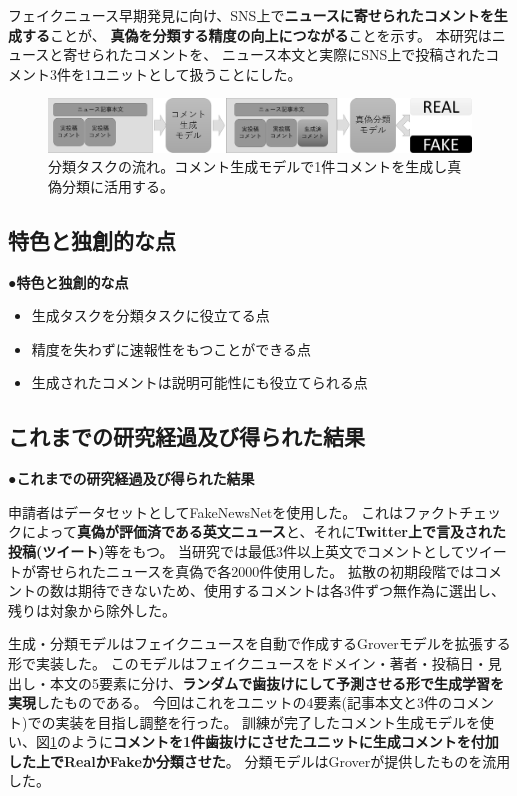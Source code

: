{	フェイクニュース早期発見に向け、SNS上で\textbf{ニュースに寄せられたコメントを生成する}ことが、
	\textbf{真偽を分類する精度の向上につながる}ことを示す。
	本研究はニュースと寄せられたコメントを、
	ニュース本文と実際にSNS上で投稿されたコメント3件を1ユニットとして扱うことにした。
	
	\begin{figure}[ht]
		\centering
		\includegraphics[width=0.95\linewidth]{model.pdf}
		\caption{分類タスクの流れ。コメント生成モデルで1件コメントを生成し真偽分類に活用する。}
		\label{fig:model}
	\end{figure}

	\subsection{特色と独創的な点}
	●\textbf{特色と独創的な点}
	
	\begin{itemize}
		\item 生成タスクを分類タスクに役立てる点
		\item 精度を失わずに速報性をもつことができる点
		\item 生成されたコメントは説明可能性にも役立てられる点
	\end{itemize}

	\subsection{これまでの研究経過及び得られた結果}
	●\textbf{これまでの研究経過及び得られた結果}

	申請者はデータセットとしてFakeNewsNet\cite{Shu2018FakeNewsNetAD}を使用した。
	これはファクトチェックによって\textbf{真偽が評価済である英文ニュース}と、それに\textbf{Twitter上で言及された投稿(ツイート)}等をもつ。
	当研究では最低3件以上英文でコメントとしてツイートが寄せられたニュースを真偽で各2000件使用した。
	拡散の初期段階ではコメントの数は期待できないため、使用するコメントは各3件ずつ無作為に選出し、残りは対象から除外した。

	生成・分類モデルはフェイクニュースを自動で作成するGroverモデル\cite{NIPS2019_9106}を拡張する形で実装した。
	このモデルはフェイクニュースをドメイン・著者・投稿日・見出し・本文の5要素に分け、\textbf{ランダムで歯抜けにして予測させる形で生成学習を実現}したものである。
	今回はこれをユニットの4要素(記事本文と3件のコメント)での実装を目指し調整を行った。
	訓練が完了したコメント生成モデルを使い、図\ref{fig:model}のように\textbf{コメントを1件歯抜けにさせたユニットに生成コメントを付加した上でRealかFakeか分類させた}。
	分類モデルはGroverが提供したものを流用した。

}
